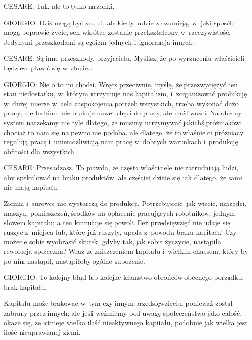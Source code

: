 \documentclass[oneside,polish,11pt,sfheadings]{mwbk}
\begin{document}
 
\noindent CESARE: Tak, ale to tylko mrzonki. 




 
\noindent GIORGIO: Dziś mogą być snami; ale kiedy ludzie zrozumieją, w~jaki sposób mogą poprawić życie, sen wkrótce zostanie
przekształcony w~rzeczywistość. Jedynymi przeszkodami są egoizm jednych i~ignorancja innych. 




 
\noindent CESARE: Są inne przeszkody, przyjacielu. Myślisz, że po wyrzuceniu właścicieli będziesz pławić się w~złocie\ldots 




 
\noindent GIORGIO: Nie o to mi chodzi. Wręcz przeciwnie, myślę, że przezwyciężyć ten stan niedostatku, w~którym utrzymuje nas
kapitalizm, i~zorganizować produkcję w~dużej mierze w~celu zaspokojenia potrzeb wszystkich, trzeba wykonać dużo pracy;
ale ludziom nie brakuje nawet chęci do pracy, ale możliwości. Na obecny system narzekamy nie tyle dlatego, że musimy
utrzymywać jakichś próżniaków: chociaż to nam się na pewno nie podoba, ale dlatego, że to właśnie ci próżniacy regulują
pracę i~uniemożliwiają nam pracę w~dobrych warunkach i~produkcję obfitości dla wszystkich. 




 
\noindent CESARE: Przesadzasz. To prawda, że często właściciele nie zatrudniają ludzi, aby spekulować na braku produktów, ale
częściej dzieje się tak dlatego, że sami nie mają kapitału. 

 
Ziemia i~surowce nie wystarczą do produkcji. Potrzebujecie, jak wiecie, narzędzi, maszyn, pomieszczeń, środków na
opłacenie pracujących robotników, jednym słowem kapitału; a ten kumuluje się powoli. Ileż przedsięwzięć nie udaje się
ruszyć z~miejsca lub, które już ruszyły, upada z~powodu braku kapitału! Czy możecie sobie wyobrazić skutek, gdyby tak,
jak sobie życzycie, nastąpiła rewolucja społeczna? Wraz ze zniszczeniem kapitału i~wielkim chaosem, który by po nim
nastąpił, nastąpiłoby ogólne zubożenie. 




 
\noindent GIORGIO: To kolejny błąd lub kolejne kłamstwo obrońców obecnego porządku: brak kapitału. 

 
Kapitału może brakować w~tym czy innym przedsięwzięciu, ponieważ został zabrany przez innych; ale jeśli weźmiemy pod
uwagę społeczeństwo jako całość, okaże się, że istnieje wielka ilość nieaktywnego kapitału, podobnie jak wielka jest
ilość nieuprawianej ziemi. 
\end{document}
